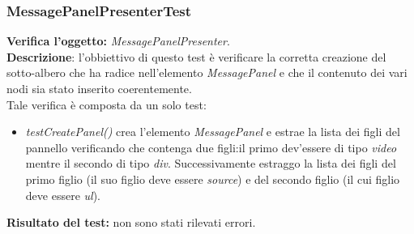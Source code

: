 \subsubsection{MessagePanelPresenterTest}
\textbf{Verifica l'oggetto:} \textit{MessagePanelPresenter}.\\
\textbf{Descrizione}: l'obbiettivo di questo test è verificare la corretta creazione del sotto-albero che ha radice nell'elemento \textit{MessagePanel} e che il contenuto dei vari nodi sia stato inserito coerentemente.\\
Tale verifica è composta da un solo test:
\begin{itemize}
\item \textit{testCreatePanel()} crea l'elemento \textit{MessagePanel} e estrae la lista dei figli del pannello verificando che contenga due figli:il primo dev'essere di tipo \textit{video} mentre il secondo di tipo \textit{div}.
Successivamente estraggo la lista dei figli del primo figlio (il suo figlio deve essere \textit{source}) e del secondo figlio (il cui figlio deve essere \textit{ul}).
\end{itemize}
\textbf{Risultato del test:} non sono stati rilevati errori.

